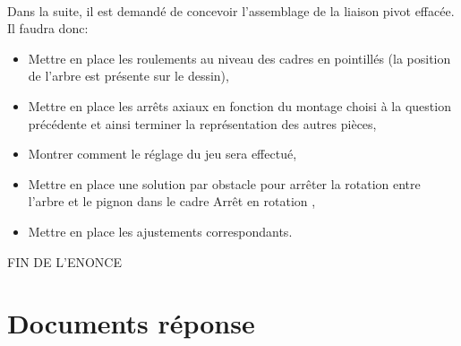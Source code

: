 

~\ \\

Dans la suite, il est demandé de concevoir l'assemblage de la liaison pivot effacée. Il faudra donc:
\begin{itemize}
 \item Mettre en place les roulements au niveau des cadres en pointillés (la position de l'arbre est présente sur le dessin),
 \item Mettre en place les arrêts axiaux en fonction du montage choisi à la question précédente et ainsi terminer la représentation des autres pièces,
 \item Montrer comment le réglage du jeu sera effectué,
 \item Mettre en place une solution par obstacle pour arrêter la rotation entre l'arbre et le pignon dans le cadre \og Arrêt en rotation \fg,
 \item Mettre en place les ajustements correspondants.
\end{itemize}




\begin{center}
\Huge{FIN DE L'ENONCE}
\end{center}

\cleardoublepage

\pagestyle{documentreponse}

\section{Documents réponse}


